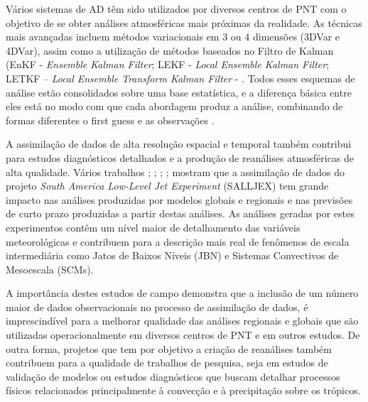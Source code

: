 Vários sistemas de AD têm sido utilizados por diversos centros de PNT com o objetivo de se obter análises atmosféricas mais próximas da realidade. As técnicas mais avançadas incluem métodos variacionais em 3 ou 4 dimensões (3DVar e 4DVar), assim como a utilização de métodos baseados no Filtro de Kalman (EnKF - \textit{Ensemble Kalman Filter}; LEKF - \textit{Local Ensemble Kalman Filter}; LETKF – \textit{Local Ensemble Transform Kalman Filter} - \cite{kalnay03}. Todos esses esquemas de análise estão consolidados sobre uma base estatística, e a diferença básica entre eles está no modo com que cada abordagem produz a análise, combinando de formas diferentes o first guess e as observações \cite{kalnay03}.

A assimilação de dados de alta resolução espacial e temporal também contribui para estudos diagnósticos detalhados e a produção de reanálises atmosféricas de alta qualidade. Vários trabalhos \cite{cavalcantiherdies04}; \cite{herdiesetal06}; \cite{rozantecavalcanti07}; \cite{herdiesetal07}; \cite{skabarnicolini09} mostram que a assimilação de dados do projeto \textit{South America Low-Level Jet Experiment} (SALLJEX) tem grande impacto nas análises produzidas por modelos globais e regionais e nas previsões de curto prazo produzidas a partir destas análises. As análises geradas por estes experimentos contêm um nível maior de detalhamento das variáveis meteorológicas e contribuem para a descrição mais real de fenômenos de escala intermediária como Jatos de Baixos Níveis (JBN) e Sistemas Convectivos de Mesoescala (SCMs). 

A importância destes estudos de campo demonstra que a inclusão de um número maior de dados observacionais no processo de assimilação de dados, é imprescindível para a melhorar qualidade das análises regionais e globais que são utilizadas operacionalmente em diversos centros de PNT e em outros estudos. De outra forma, projetos que tem por objetivo a criação de reanálises também contribuem para a qualidade de trabalhos de pesquisa, seja em estudos de validação de modelos ou estudos diagnósticos que buscam detalhar processos físicos relacionados principalmente à convecção e à precipitação sobre os trópicos. 

